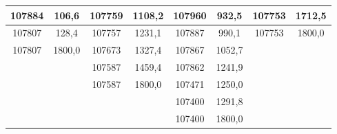 \documentclass[11pt]{article}
\begin{document}
{{\begin{tabular}{|c|c|c|c|c|c|c|c|}
            107884 & 106,6 & 107759 & 1108,2 & 107960 & 932,5 & 107753 & 1712,5\tabularnewline
            \hline 
            107807 & 128,4 & 107757 & 1231,1 & 107887 & 990,1 & 107753 & 1800,0\tabularnewline
            \hline 
            107807 & 1800,0 & 107673 & 1327,4 & 107867 & 1052,7 & \multicolumn{1}{c}{} & \multicolumn{1}{c}{}\tabularnewline
            \cline{1-6} 
            \multicolumn{1}{c}{} &  & 107587 & 1459,4 & 107862 & 1241,9 & \multicolumn{1}{c}{} & \multicolumn{1}{c}{}\tabularnewline
            \cline{3-6} 
            \multicolumn{1}{c}{} &  & 107587 & 1800,0 & 107471 & 1250,0 & \multicolumn{1}{c}{} & \multicolumn{1}{c}{}\tabularnewline
            \cline{3-6} 
            \multicolumn{1}{c}{} & \multicolumn{1}{c}{} & \multicolumn{1}{c}{} &  & 107400 & 1291,8 & \multicolumn{1}{c}{} & \multicolumn{1}{c}{}\tabularnewline
            \cline{5-6} 
            \multicolumn{1}{c}{} & \multicolumn{1}{c}{} & \multicolumn{1}{c}{} &  & 107400 & 1800,0 & \multicolumn{1}{c}{} & \multicolumn{1}{c}{}\tabularnewline
            \cline{5-6} 
        \end{tabular}
    }
}
\vspace*{\fill}\vspace*{\fill}
\end{document}
